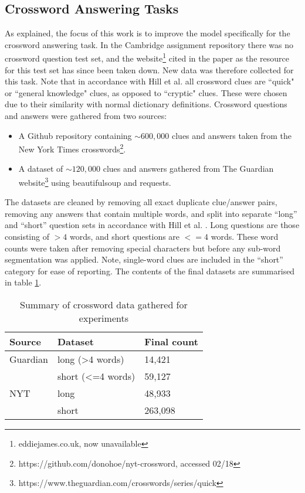 \documentclass[11pt]{article}
\begin{document}
\begin{spacing}{1}
\subsection{Crossword Answering Tasks}
As explained, the focus of this work is to improve the model specifically for the crossword answering task. In the Cambridge assignment repository there was no crossword question test set, and the website\footnote{eddiejames.co.uk, now unavailable} cited in the paper as the resource for this test set has since been taken down. New data was therefore collected for this task. Note that in accordance with Hill et al. \citeyear{hill2015learning} all crossword clues are ``quick" or ``general knowledge" clues, as opposed to ``cryptic" clues. These were chosen due to their similarity with normal dictionary definitions. Crossword questions and answers were gathered from two sources:
\begin{itemize}
\item[1.] A Github repository containing $\sim600,000$ clues and answers taken from the New York Times crosswords\footnote{https://github.com/donohoe/nyt-crossword, accessed 02/18}.
\item[2.] A dataset of $\sim120,000$ clues and answers gathered from The Guardian website\footnote{https://www.theguardian.com/crosswords/series/quick} using beautifulsoup and requests. 
\end{itemize}

The datasets are cleaned by removing all exact duplicate clue/answer pairs, removing any answers that contain multiple words, and split into separate ``long'' and ``short'' question sets in accordance with Hill et al. \citeyear{hill2015learning}. Long questions are those consisting of $>4$ words, and short questions are $<=4$ words. These word counts were taken after removing special characters but before any sub-word segmentation was applied. Note, single-word clues are included in the ``short'' category for ease of reporting. The contents of the final datasets are summarised in table \ref{crossword_data}. 

\begin{table}[!htbp]
\centering
\caption{Summary of crossword data gathered for experiments}
\begin{tabular}{lll}
\toprule
Source   & Dataset                      & Final count \\\midrule
Guardian & long (\textgreater{}4 words) & 14,421      \\
         & short (\textless{}=4 words)  & 59,127      \\\midrule
NYT      & long                         & 48,933      \\
         & short                        & 263,098    
\end{tabular}
\label{crossword_data}
\end{table}


\end{spacing}
\end{document}

